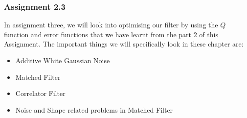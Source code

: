 \documentclass{beamer}
\begin{document}
\begin{frame}
	\frametitle { Assignment 2.3}
In assignment three, we will look into optimising our filter by using the $Q$ function and error functions that we have learnt from the part 2 of this Assignment. The important things we will specifically look in these chapter are:
\begin{itemize}
	\item Additive White Gaussian Noise
	\item Matched Filter
	\item Correlator Filter
	\item Noise and Shape related problems in Matched Filter
\end{itemize}
\end{frame}
	
\end{document}
